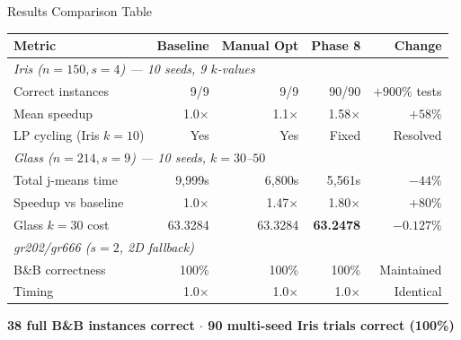 \documentclass[aspectratio=169,12pt]{beamer}
\begin{document}
\begin{frame}{Results Comparison Table}
  \begin{center}
  \small
  \begin{tabular}{lrrrr}
    \toprule
    \textbf{Metric} & \textbf{Baseline} & \textbf{Manual Opt} & \textbf{Phase 8} & \textbf{Change} \\
    \midrule
    \multicolumn{5}{l}{\textit{Iris ($n=150, s=4$) — 10 seeds, 9 $k$-values}} \\
    Correct instances & 9/9 & 9/9 & \cellcolor{goodgreen!20}90/90 & $+900\%$ tests \\
    Mean speedup & 1.0$\times$ & 1.1$\times$ & \cellcolor{goodgreen!20}1.58$\times$ & $+58\%$ \\
    LP cycling (Iris $k=10$) & \cellcolor{badred!20}Yes & \cellcolor{badred!20}Yes & \cellcolor{goodgreen!20}Fixed & Resolved \\[4pt]
    \multicolumn{5}{l}{\textit{Glass ($n=214, s=9$) — 10 seeds, $k=30$--$50$}} \\
    Total j-means time & 9{,}999s & 6{,}800s & \cellcolor{goodgreen!20}5{,}561s & $-44\%$ \\
    Speedup vs baseline & 1.0$\times$ & 1.47$\times$ & \cellcolor{goodgreen!20}1.80$\times$ & $+80\%$ \\
    Glass $k=30$ cost & 63.3284 & 63.3284 & \cellcolor{goodgreen!20}\textbf{63.2478} & $-0.127\%$ \\[4pt]
    \multicolumn{5}{l}{\textit{gr202/gr666 ($s=2$, 2D fallback)}} \\
    B\&B correctness & 100\% & 100\% & \cellcolor{goodgreen!20}100\% & Maintained \\
    Timing & 1.0$\times$ & 1.0$\times$ & 1.0$\times$ & Identical \\
    \bottomrule
  \end{tabular}
  \end{center}

  \vspace{0.2em}
  \begin{center}
    \textbf{38 full B\&B instances correct $\cdot$ 90 multi-seed Iris trials correct (100\%)}
  \end{center}
\end{frame}
\end{document}
